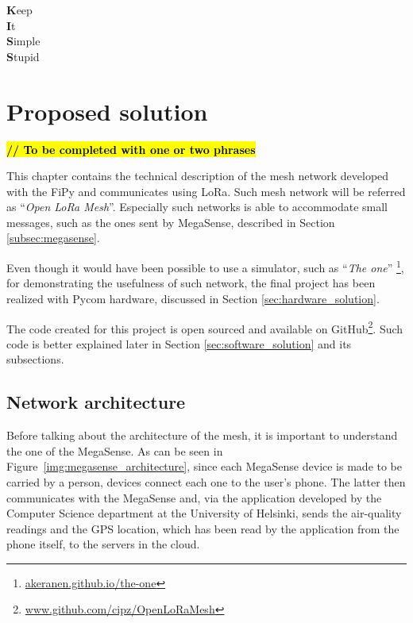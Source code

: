 
\begin{savequote}[40mm]
	\textbf{K}eep\\
	\textbf{I}t\\
	\textbf{S}imple\\
	\textbf{S}tupid
\end{savequote}

\chapter{Proposed solution}\label{chapter:proposed_solution}
	
	\textbf{\textcolor{red}{\hl{// To be completed with one or two phrases}}}

	This chapter contains the technical description of the mesh network developed with the FiPy and communicates using LoRa.
	Such mesh network will be referred as ``\textit{Open LoRa Mesh}''.
	Especially such networks is able to accommodate small messages, such as the ones sent by MegaSense, described in Section \ref{subsec:megasense}.

	Even though it would have been possible to use a simulator, such as ``\textit{The one}'' \footnote{ \url{akeranen.github.io/the-one}}, for demonstrating the usefulness of such network, the final project has been realized with Pycom hardware, discussed in Section \ref{sec:hardware_solution}.
	
	The code created for this project is open sourced and available on GitHub\footnote{ \url{www.github.com/cipz/OpenLoRaMesh}}.
	Such code is better explained later in Section \ref{sec:software_solution} and its subsections.
	
	\section{Network architecture}\label{sec:architecture}
		
		Before talking about the architecture of the mesh, it is important to understand the one of the MegaSense.
		As can be seen in Figure~\ref{img:megasense_architecture}, since each MegaSense device is made to be carried by a person, devices connect each one to the user's phone.
		The latter then communicates with the MegaSense and, via the application developed by the Computer Science department at the University of Helsinki, sends the air-quality readings and the GPS location, which has been read by the application from the phone itself, to the servers in the cloud.
		
